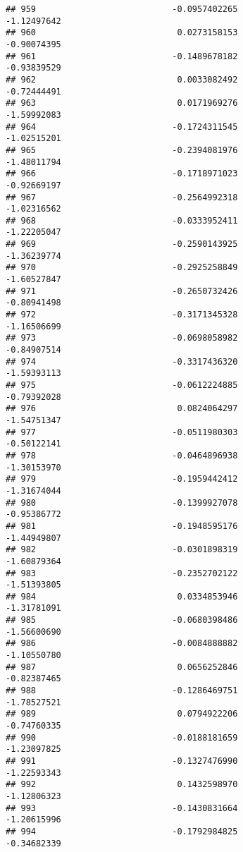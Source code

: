 \documentclass[
]{article}
\begin{document}
\begin{verbatim}
## 959                           -0.0957402265                -1.12497642
## 960                            0.0273158153                -0.90074395
## 961                           -0.1489678182                -0.93839529
## 962                            0.0033082492                -0.72444491
## 963                            0.0171969276                -1.59992083
## 964                           -0.1724311545                -1.02515201
## 965                           -0.2394081976                -1.48011794
## 966                           -0.1718971023                -0.92669197
## 967                           -0.2564992318                -1.02316562
## 968                           -0.0333952411                -1.22205047
## 969                           -0.2590143925                -1.36239774
## 970                           -0.2925258849                -1.60527847
## 971                           -0.2650732426                -0.80941498
## 972                           -0.3171345328                -1.16506699
## 973                           -0.0698058982                -0.84907514
## 974                           -0.3317436320                -1.59393113
## 975                           -0.0612224885                -0.79392028
## 976                            0.0824064297                -1.54751347
## 977                           -0.0511980303                -0.50122141
## 978                           -0.0464896938                -1.30153970
## 979                           -0.1959442412                -1.31674044
## 980                           -0.1399927078                -0.95386772
## 981                           -0.1948595176                -1.44949807
## 982                           -0.0301898319                -1.60879364
## 983                           -0.2352702122                -1.51393805
## 984                            0.0334853946                -1.31781091
## 985                           -0.0680398486                -1.56600690
## 986                           -0.0084888882                -1.10550780
## 987                            0.0656252846                -0.82387465
## 988                           -0.1286469751                -1.78527521
## 989                            0.0794922206                -0.74760335
## 990                           -0.0188181659                -1.23097825
## 991                           -0.1327476990                -1.22593343
## 992                            0.1432598970                -1.12806323
## 993                           -0.1430831664                -1.20615996
## 994                           -0.1792984825                -0.34682339

\end{verbatim}
\end{document}
